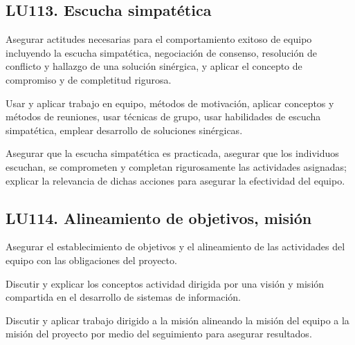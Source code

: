 \subsection{LU113. Escucha simpatética}\label{sec:BOK-LU113}\label{sec:LU113}
\begin{LearningUnit}
\begin{LUGoal}
\item Asegurar actitudes necesarias para el comportamiento exitoso de equipo incluyendo la escucha simpatética, negociación de consenso, resolución de conflicto y hallazgo de una solución sinérgica, y aplicar el concepto de compromiso y de completitud rigurosa.
\end{LUGoal}

\begin{LUObjective}
\item Usar y aplicar trabajo en equipo, métodos de motivación, aplicar conceptos y métodos de reuniones, usar técnicas de grupo, usar habilidades de escucha simpatética, emplear desarrollo de soluciones sinérgicas.
\item Asegurar que la escucha simpatética es practicada, asegurar que los individuos escuchan, se comprometen y completan rigurosamente las actividades asignadas; explicar la relevancia de dichas acciones para asegurar la efectividad del equipo.
\end{LUObjective}
\end{LearningUnit}

\subsection{LU114. Alineamiento de objetivos, misión}\label{sec:BOK-LU114}\label{sec:LU114}
\begin{LearningUnit}
\begin{LUGoal}
\item Asegurar el establecimiento de objetivos y el alineamiento de las actividades del equipo con las obligaciones del proyecto.
\end{LUGoal}

\begin{LUObjective}
\item Discutir y explicar los conceptos actividad dirigida por una visión y misión compartida en el desarrollo de sistemas de información.
\item Discutir y aplicar trabajo dirigido a la misión alineando la misión del equipo a la misión del proyecto por medio del seguimiento para asegurar resultados.
\end{LUObjective}
\end{LearningUnit}

